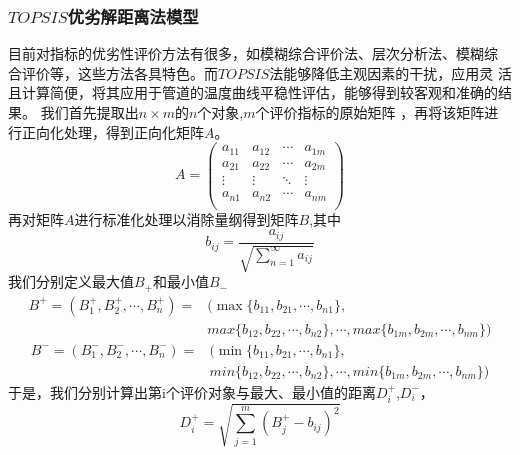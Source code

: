         \subsubsection{$TOPSIS$优劣解距离法模型}
        目前对指标的优劣性评价方法有很多，如模糊综合评价法、层次分析法、模糊综
        合评价等，这些方法各具特色。而$TOPSIS$法能够降低主观因素的干扰，应用灵
        活且计算简便，将其应用于管道的温度曲线平稳性评估，能够得到较客观和准确的结果。
        我们首先提取出$n×m$的$n$个对象,$m$个评价指标的原始矩阵
        ，再将该矩阵进行正向化处理，得到正向化矩阵$A$。
        \begin{equation}
            A=\begin{pmatrix}
                a_{11} & a_{12} & \cdots& a_{1m}\\
                a_{21} & a_{22} & \cdots& a_{2m}\\
                \vdots & \vdots & \ddots& \vdots\\
                a_{n1} & a_{n2} & \cdots& a_{nm}\\
                \end{pmatrix}
        \end{equation}
        再对矩阵$A$进行标准化处理以消除量纲得到矩阵$B$,其中
        \begin{equation}
            b_{ij}=\frac{a_{ij}}{\sqrt{\sum_{n = 1}^{\infty} a_{ij}  }}
        \end{equation}
        我们分别定义最大值$B_+$和最小值$B_-$
        \begin{equation}
            \begin{aligned}
                B^+ = (B_1^+, B_2^+,\cdots, B_n^+)=&(\max \{b_{11},b_{21},\cdots,b_{n1}\},\\
                &max\{b_{12},b_{22},\cdots,b_{n2}\},\cdots,max\{b_{1m},b_{2m},\cdots,b_{nm}\})      
            \end{aligned}
        \end{equation}
        \begin{equation}
            \begin{aligned}
                B^- = (B_1^-, B_2^-,\cdots, B_n^-)=&(\min \{b_{11},b_{21},\cdots,b_{n1}\},\\
                &min\{b_{12},b_{22},\cdots,b_{n2}\},\cdots,min\{b_{1m},b_{2m},\cdots,b_{nm}\})
            \end{aligned}
        \end{equation}
        于是，我们分别计算出第i个评价对象与最大、最小值的距离$D_i^+$,$D_i^-$，
        \begin{equation}
            D_i^+ = \sqrt{\sum_{j=1}^{m} (B_j^+ - b_{ij})^2}
        \end{equation}
